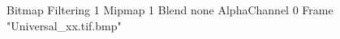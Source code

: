 {Bitmap
	{Filtering 1}
	{Mipmap 1}
	{Blend none}
	{AlphaChannel 0}
	{Frame "Universal_xx.tif.bmp"}
}
